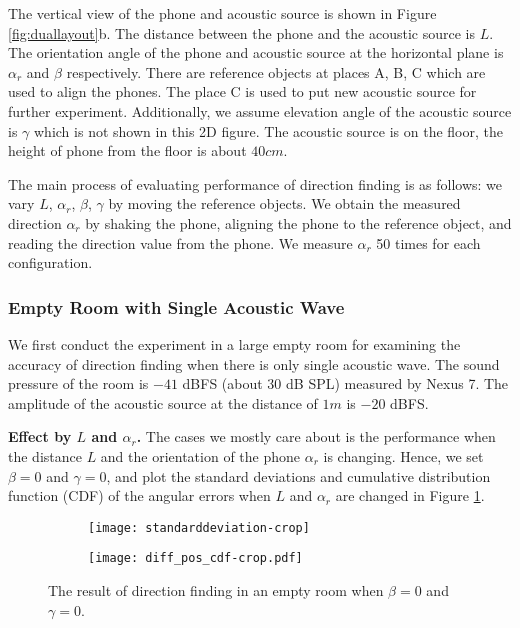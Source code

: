 \documentclass[]{sig-alternate-10pt}
\begin{document}
The vertical view of the phone and acoustic source is shown in Figure
\ref{fig:duallayout}b. The distance between the phone and the acoustic
source is $L$. The orientation angle of the phone and acoustic source
at the horizontal plane is $\alpha_r$ and $\beta$ respectively. There
are reference objects at places A, B, C which are used to align
the phones. The place C is used to put new acoustic source for
further experiment. Additionally, we assume elevation angle of the
acoustic source is $\gamma$ which is not shown in this 2D figure. The
acoustic source is  on the floor, the height of phone from the
floor is about $40cm$.

The main process of evaluating performance of direction finding is as
follows: we
vary $L$, $\alpha_r$, $\beta$, $\gamma$ by moving the reference
objects. We obtain the measured direction $\alpha_r$ by shaking
the phone, aligning the phone to the reference object, and reading
the direction value from the phone. We measure $\alpha_r$ 50 times
for each configuration.


\subsubsection{Empty Room with Single Acoustic Wave}

We first conduct the experiment in a large empty room  for
 examining the accuracy of direction finding
 when there is only single acoustic wave. The sound pressure of the room is $-41$ dBFS (about 30 dB SPL) measured by Nexus 7.  The amplitude of the acoustic source at the distance of $1m$ is $-20$ dBFS.

\noindent\textbf{Effect by $L$ and $\alpha_r$.} The cases we mostly
care about is the performance when the distance $L$ and the
orientation of the phone $\alpha_r$ is changing. Hence, we set
$\beta=0$ and $\gamma=0$, and plot the standard deviations
and cumulative distribution function (CDF) of the angular errors when $L$ and
$\alpha_r$ are changed in Figure \ref{fig:initresult}.

\begin{figure}[h]
\begin{subfigure}[b]{0.235\textwidth}
\texttt{[image: standarddeviation-crop]}
\end{subfigure}
\begin{subfigure}[b]{0.2\textwidth}
\texttt{[image: diff\_pos\_cdf-crop.pdf]}
\end{subfigure}
    \caption{The result of direction finding in an empty room when $\beta=0$ and $\gamma=0$.}
    \label{fig:initresult}
\end{figure}
\end{document}
